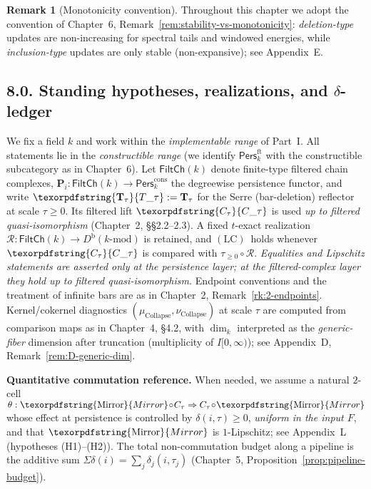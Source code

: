\documentclass[11pt]{article}
\numberwithin{equation}{section}
\theoremstyle{plain}
\theoremstyle{definition}
\theoremstyle{remark}
\DeclareRobustCommand{\hyp}{\nobreakdash-}
\newcommand{\Pers}{\mathsf{Pers}}
\newcommand{\Rfun}{\mathcal{R}}
\theoremstyle{plain}
\theoremstyle{definition}
\numberwithin{equation}{section}
\theoremstyle{definition}
\newtheorem{remark}[theorem]{Remark}
\DeclareRobustCommand{\FiltCh}[1]{\mathsf{FiltCh}(#1)}
\DeclareRobustCommand{\Ttau}{\texorpdfstring{\ensuremath{\mathbf{T}_{\tau}}}{T\_\tau}}
\DeclareRobustCommand{\Ctau}{\texorpdfstring{\ensuremath{C_{\tau}}}{C\_\tau}}
\DeclareRobustCommand{\LC}{\texorpdfstring{\ensuremath{\mathrm{(LC)}}}{(LC)}}
\DeclareRobustCommand{\Mirror}{\texorpdfstring{\ensuremath{\operatorname{Mirror}}}{Mirror}}
\numberwithin{equation}{section}
\theoremstyle{plain}
\theoremstyle{definition}
\theoremstyle{remark}
\providecommand{\Cfun}[1]{\mathsf{C}_{#1}}
\providecommand{\Tfun}[1]{\mathbf{T}_{#1}}
\providecommand{\Ctau}{\Cfun{\tau}}
\providecommand{\Ttau}{\Tfun{\tau}}
\begin{document}
\begin{remark}[Monotonicity convention]
Throughout this chapter we adopt the convention of
Chapter~6, Remark~\ref{rem:stability-vs-monotonicity}:
\emph{deletion\hyp type} updates are non\hyp increasing for spectral tails and windowed energies,
while \emph{inclusion\hyp type} updates are only stable (non\hyp expansive); see Appendix~E.
\end{remark}

\subsection*{8.0. Standing hypotheses, realizations, and $\delta$-ledger}
We fix a field \(k\) and work within the \emph{implementable range} of Part~I.
All statements lie in the \emph{constructible range} (we identify \(\Pers^{\mathrm{ft}}_k\) with the constructible subcategory as in Chapter~6).
Let \(\FiltCh{k}\) denote finite\hyp type filtered chain complexes,
\(\mathbf{P}_i:\FiltCh{k}\to\Pers^{\mathrm{cons}}_k\) the degreewise persistence functor, and write
\(\Ttau:=\mathbf{T}_\tau\) for the Serre (bar\hyp deletion) reflector at scale \(\tau\ge 0\).
Its filtered lift \(\Ctau\) is used \emph{up to filtered quasi\hyp isomorphism} (Chapter~2, §§2.2–2.3).
A fixed \(t\)\hyp exact realization \(\Rfun:\FiltCh{k}\to D^{\mathrm{b}}(k\text{-mod})\) is retained, and \LC\ holds whenever \(\Ctau\) is compared with \(\tau_{\ge 0}\!\circ\!\Rfun\).
\emph{Equalities and Lipschitz statements are asserted only at the persistence layer; at the filtered\hyp complex layer they hold up to filtered quasi\hyp isomorphism.}
Endpoint conventions and the treatment of infinite bars are as in Chapter~2, Remark~\ref{rk:2-endpoints}.
Kernel/cokernel diagnostics \((\mu_{\mathrm{Collapse}},\nu_{\mathrm{Collapse}})\) at scale \(\tau\) are computed from comparison maps as in Chapter~4, §4.2, with \(\dim_k\) interpreted as the \emph{generic\hyp fiber} dimension after truncation (multiplicity of \(I[0,\infty)\)); see Appendix~D, Remark~\ref{rem:D-generic-dim}.

\noindent\textbf{Quantitative commutation reference.}
When needed, we assume a natural \(2\)\hyp cell \(\theta:\Mirror\!\circ\! C_\tau\Rightarrow C_\tau\!\circ\!\Mirror\) whose effect at persistence is controlled by \(\delta(i,\tau)\ge 0\), \emph{uniform in the input \(F\)}, and that \(\Mirror\) is \(1\)\hyp Lipschitz; see Appendix~L (hypotheses \textup{(H1)}–\textup{(H2)}). The total non\hyp commutation budget along a pipeline is the additive sum \(\Sigma\delta(i)=\sum_j \delta_j(i,\tau_j)\) (Chapter~5, Proposition~\ref{prop:pipeline-budget}).
\end{document}
